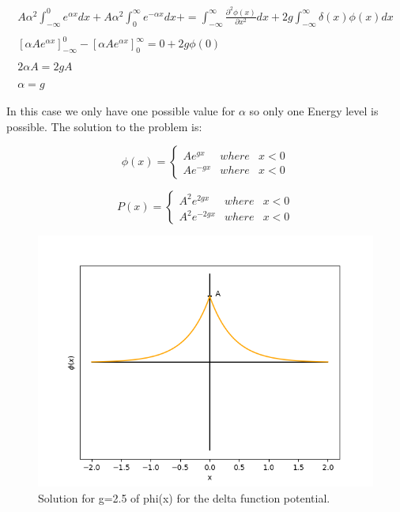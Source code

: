 \begin{equation}
    \label{4.11}
        \begin{array}{c}
            A\alpha^2\int_{-\infty}^{0}e^{\alpha x}dx+ A \alpha^2\int_{0}^{\infty}e^{-\alpha x}dx+ = \int_{-\infty}^{\infty} \frac{\partial^2\phi(x)}{\partial x^2} dx + 2g\int_{-\infty}^{\infty}\delta(x)\phi(x)dx
            \\

            \\
            \left[\alpha Ae^{\alpha x}\right]_{-\infty}^{0}-\left[\alpha Ae^{\alpha x}\right]_{0}^{\infty} = 0 + 2g\phi(0)
            \\

            \\
            2\alpha A = 2gA
            \\

            \\
            \alpha = g
        \end{array}
\end{equation}

In this case we only have one possible value for $\alpha$ so only one Energy level is possible. The solution to the problem is:

\begin{equation}
\label{4.12}
\phi(x) = \left\{ \begin{array}{lcc}
     Ae^{gx}    & where  &  x<0  \\
     Ae^{-gx}   & where  &  x<0
\end{array}\right.
\end{equation}

\begin{equation}
\label{4.13}
P(x) = \left\{ \begin{array}{lcc}
     A^2e^{2gx}    & where  &  x<0  \\
     A^2e^{-2gx}   & where  &  x<0
\end{array}\right.
\end{equation}

\begin{figure}
  \includegraphics{images4/phi(x).png}
  \centering
  \caption{Solution for g=2.5 of phi(x) for the delta function potential.}
\end{figure}


